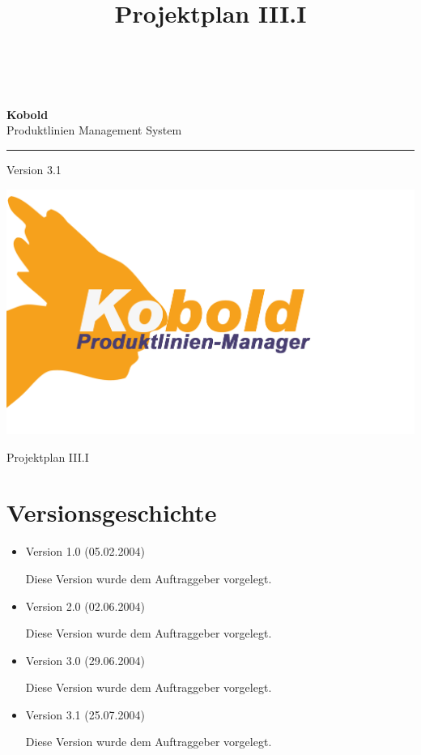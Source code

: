 \documentclass[a4paper,titlepage,12pt,ngerman]{scrbook}
\title {\huge \product\\[0.5cm]\large Projektplan III.I\\[0.5cm] \version
  \\[1cm] \Large \company}
\newcommand\version{Version 3.1\xspace}
\begin{document}

\begin{titlepage}
\renewcommand{\thefootnote}{\fnsymbol{footnote}}
{\Huge
\raggedright
\textbf{\bf Kobold} \\
\huge Produktlinien Management System
\rule{\textwidth}{0.75pt}
\par
}
\begin{flushleft}
\normalsize
\version
\end{flushleft}

\vspace*{3cm}
\begin{center}
\includegraphics[width=15cm]{../common/logo-color.png}
\end{center}
\vfill

{\parindent=0cm
\Huge Projektplan III.I
}


\setcounter{footnote}{0}
\end{titlepage}


\section*{Versionsgeschichte}

\begin{itemize}

\item Version 1.0 (05.02.2004)

  Diese Version wurde dem Auftraggeber vorgelegt.

\item Version 2.0 (02.06.2004)

  Diese Version wurde dem Auftraggeber vorgelegt.

\item Version 3.0 (29.06.2004)

  Diese Version wurde dem Auftraggeber vorgelegt.

\item Version 3.1 (25.07.2004)

  Diese Version wurde dem Auftraggeber vorgelegt.

\end{itemize}
\end{document}
